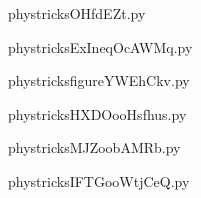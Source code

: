     \newcommand{\CaptionFigOHfdEZt}{<+Type your caption here+>}
    \begin{center}
        
    \end{center}
    phystricksOHfdEZt.py

    

    \clearpage
    


    \newcommand{\CaptionFigExIneqOcAWMq}{<+Type your caption here+>}
    \begin{center}
        
    \end{center}
    phystricksExIneqOcAWMq.py

    

    \clearpage
    


    \newcommand{\CaptionFigfigureYWEhCkv}{<+Type your caption here+>}
    \begin{center}
        
    \end{center}
    phystricksfigureYWEhCkv.py

    

    \clearpage
    


    \newcommand{\CaptionFigHXDOooHsfhus}{<+Type your caption here+>}
    \begin{center}
        
    \end{center}
    phystricksHXDOooHsfhus.py

    

    \clearpage
    


    \newcommand{\CaptionFigMJZoobAMRb}{<+Type your caption here+>}
    \begin{center}
        
    \end{center}
    phystricksMJZoobAMRb.py

    

    \clearpage
    


    \newcommand{\CaptionFigIFTGooWtjCeQ}{<+Type your caption here+>}
    \begin{center}
        
    \end{center}
    phystricksIFTGooWtjCeQ.py

